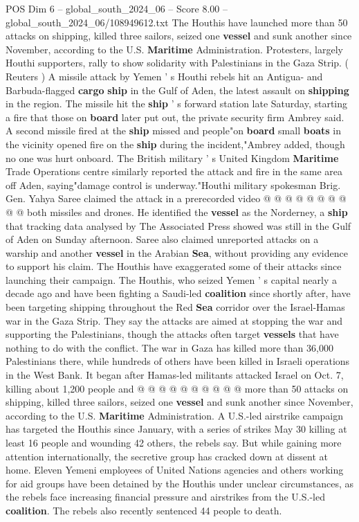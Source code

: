 \begin{textsample}{POS Dim 6 – global\_south\_2024\_06 – Score 8.00 – global\_south\_2024\_06/108949612.txt}  \label{ex:f6_pos_151}
The Houthis have launched more than 50 attacks on shipping, killed three sailors, seized one \textbf{vessel} and sunk another since November, according to the U.S. \textbf{Maritime} Administration.
Protesters, largely Houthi supporters, rally to show solidarity with Palestinians in the Gaza Strip. ( Reuters ) A missile attack by Yemen ' s Houthi rebels hit an Antigua- and Barbuda-flagged \textbf{cargo} \textbf{ship} in the Gulf of Aden, the latest assault on \textbf{shipping} in the region.
The missile hit the \textbf{ship} ' s forward station late Saturday, starting a fire that those on \textbf{board} later put out, the private security firm Ambrey said.
A second missile fired at the \textbf{ship} missed and people"on \textbf{board} small \textbf{boats} in the vicinity opened fire on the \textbf{ship} during the incident,"Ambrey added, though no one was hurt onboard.
The British military ' s United Kingdom \textbf{Maritime} Trade Operations centre similarly reported the attack and fire in the same area off Aden, saying"damage control is underway."Houthi military spokesman Brig.
Gen.
Yahya Saree claimed the attack in a prerecorded video @ @ @ @ @ @ @ @ @ @ both missiles and drones.
He identified the \textbf{vessel} as the Norderney, a \textbf{ship} that tracking data analysed by The Associated Press showed was still in the Gulf of Aden on Sunday afternoon.
Saree also claimed unreported attacks on a warship and another \textbf{vessel} in the Arabian \textbf{Sea}, without providing any evidence to support his claim.
The Houthis have exaggerated some of their attacks since launching their campaign.
The Houthis, who seized Yemen ' s capital nearly a decade ago and have been fighting a Saudi-led \textbf{coalition} since shortly after, have been targeting shipping throughout the Red \textbf{Sea} corridor over the Israel-Hamas war in the Gaza Strip.
They say the attacks are aimed at stopping the war and supporting the Palestinians, though the attacks often target \textbf{vessels} that have nothing to do with the conflict.
The war in Gaza has killed more than 36,000 Palestinians there, while hundreds of others have been killed in Israeli operations in the West Bank.
It began after Hamas-led militants attacked Israel on Oct. 7, killing about 1,200 people and @ @ @ @ @ @ @ @ @ @ more than 50 attacks on shipping, killed three sailors, seized one \textbf{vessel} and sunk another since November, according to the U.S. \textbf{Maritime} Administration.
A U.S.-led airstrike campaign has targeted the Houthis since January, with a series of strikes May 30 killing at least 16 people and wounding 42 others, the rebels say.
But while gaining more attention internationally, the secretive group has cracked down at dissent at home.
Eleven Yemeni employees of United Nations agencies and others working for aid groups have been detained by the Houthis under unclear circumstances, as the rebels face increasing financial pressure and airstrikes from the U.S.-led \textbf{coalition}.
The rebels also recently sentenced 44 people to death.

\end{textsample}
